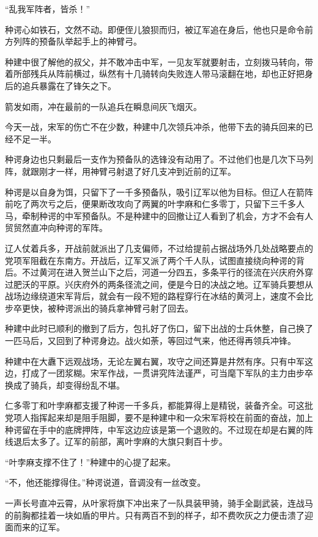 “乱我军阵者，皆杀！”

种谔心如铁石，文然不动。即便侄儿狼狈而归，被辽军追在身后，他也只是命令前方列阵的预备队举起手上的神臂弓。

种建中很了解他的叔父，并不敢冲击中军，一见友军就要射击，立刻拨马转向，带着所部残兵从阵前横过，纵然有十几骑转向失败连人带马滚翻在地，却也正好把身后的追兵暴露在了锋矢之下。

箭发如雨，冲在最前的一队追兵在瞬息间灰飞烟灭。

今天一战，宋军的伤亡不在少数，种建中几次领兵冲杀，他带下去的骑兵回来的已经不足一半。

种谔身边也只剩最后一支作为预备队的选锋没有动用了。不过他们也是几次下马列阵，就跟刚才一样，用神臂弓射退了好几支冲到近前的辽军。

种谔是以自身为饵，只留下了一千多预备队，吸引辽军以他为目标。但辽人在箭阵前吃了两次亏之后，便果断改攻向了两翼的叶孛麻和仁多零丁，只留下三千多人马，牵制种谔的中军预备队。不是种建中的回撤让辽人看到了机会，方才不会有人贸贸然直冲向种谔的军阵。

辽人仗着兵多，开战前就派出了几支偏师，不过给提前占据战场外几处战略要点的党项军阻截在东南方。开战后，辽军又派了两个千人队，试图直接绕向种谔的背后。不过黄河在进入贺兰山下之后，河道一分四五，多条平行的径流在兴庆府外穿过肥沃的平原。兴庆府外的两条径流之间，便是今日的决战之地。辽军骑兵要想从战场边缘绕道宋军背后，就会有一段不短的路程穿行在冰结的黄河上，速度不会比步卒更快，被种谔派出的骑兵拿神臂弓射了回去。

种建中此时已顺利的撤到了后方，包扎好了伤口，留下出战的士兵休整，自己换了一匹马后，又回到了种谔身边。战火如荼，等回过气来，他还得再领兵冲锋。

种建中在大纛下远观战场，无论左翼右翼，攻守之间还算是井然有序。只有中军这边，打成了一团浆糊。宋军作战，一贯讲究阵法谨严，可当麾下军队的主力由步卒换成了骑兵，却变得纷乱不堪。

仁多零丁和叶孛麻都支援了种谔一千多兵，都能算得上是精锐，装备齐全。可这批党项人指挥起来却是阻手阻脚，要不是种建中和一众宋军将校在前面的奋战，加上种谔留在手中的底牌押阵，中军这边应该是第一个退败的。不过现在却是右翼的阵线退后太多了。辽军的前部，离叶孛麻的大旗只剩百十步。

“叶孛麻支撑不住了！”种建中的心提了起来。

“不，他还能撑得住。”种谔说道，音调没有一丝改变。

一声长号直冲云霄，从叶家将旗下冲出来了一队具装甲骑，骑手全副武装，连战马的前胸都挂着一块如盾的甲片。只有两百不到的样子，却不费吹灰之力便击溃了迎面而来的辽军。

